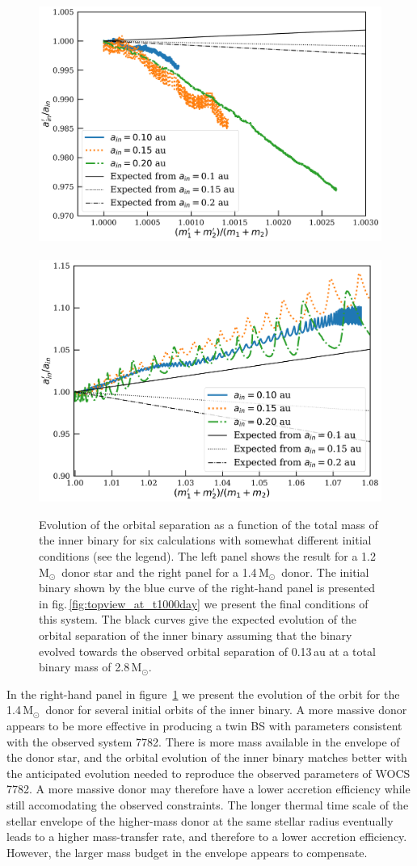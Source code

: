 \documentclass[twocolumn]{aastex62}
\newcommand{\MSun}{\mbox{M$_\odot$}}
\begin{document}
\begin{figure}[ht!]
  \includegraphics[width=0.51\linewidth]{fig_orbital_evolution_for_12MSun.pdf}
~  \includegraphics[width=0.49\linewidth]{fig_orbital_evolution_for_14MSun.pdf}
  \caption{Evolution of the orbital separation as a function of the
    total mass of the inner binary for six calculations with somewhat
    different initial conditions (see the legend). The left panel
    shows the result for a 1.2\,\MSun\, donor star and the right panel
    for a 1.4\,\MSun\, donor. The initial binary shown by the blue
    curve of the right-hand panel is presented in
    fig.\,\ref{fig:topview_at_t1000day} we present the final
    conditions of this system.  The black curves give the expected
    evolution of the orbital separation of the inner binary assuming
    that the binary evolved towards the observed orbital separation of
    0.13\,au at a total binary mass of 2.8\,\MSun.
\label{fig:mass_vs_semimajor_axis}}
\end{figure}

In the right-hand panel in figure~\ref{fig:mass_vs_semimajor_axis} we
present the evolution of the orbit for the 1.4\,\MSun\, donor for
several initial orbits of the inner binary. A more massive donor
appears to be more effective in producing a twin BS with parameters
consistent with the observed system 7782. There is more mass available
in the envelope of the donor star, and the orbital evolution of the
inner binary matches better with the anticipated evolution
needed to reproduce the observed parameters of WOCS 7782.  A
more massive donor may therefore have a lower accretion efficiency
while still accomodating the observed constraints.  The longer thermal
time scale of the stellar envelope of the higher-mass donor at the
same stellar radius eventually leads to a higher mass-transfer rate,
and therefore to a lower accretion efficiency. However, the larger
mass budget in the envelope appears to compensate.
\end{document}
